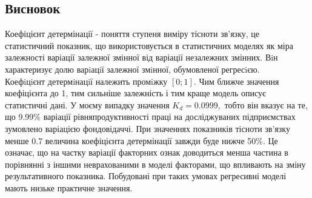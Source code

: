 \documentclass[12pt]{article}
\begin{document}
\subsection{Висновок}
Коефіцієнт детермінації -  поняття ступеня виміру тісноти зв’язку, це статистичний показник, що використовується в статистичних моделях як міра залежності варіації залежної змінної від варіації незалежних змінних.  Вiн характеризує долю варiацiї залежної змiнної, обумовленої регресiєю. \\
Коефiцiєнт детермiнацiї належить промiжку $[0;1].$ Чим ближче значення коефіцієнта до 1, тим сильніше залежність і тим краще модель описує статистичні дані. 
У моєму випадку значення $K_{d} = 0.0999,$ тобто він вказує на те, що 9.99\% варіації рівняпродуктивності праці на досліджуваних підприємствах зумовлено варіацією фондовідаччі. При значеннях показників тісноти зв'язку менше $0.7$ величина коефіцієнта детермінації завжди буде нижче 50\%. Це означає, що на частку варіації факторних ознак доводиться менша частина в порівнянні з іншими неврахованими в моделі факторами, що впливають на зміну результативного показника. Побудовані при таких умовах регресивні моделі мають низьке практичне значення.
\end{document}
